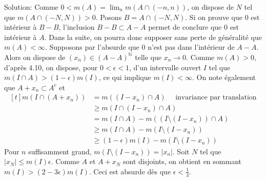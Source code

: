 \documentclass{report}
\begin{document}
Solution: Comme $0<m(A) = \lim_n m(A \cap (-n,n))$, on dispose de $N$ tel que $m(A\cap (-N,N))>0$. Posons $B=A \cap (-N,N)$. Si on prouve que $0$ est intérieur à $B-B$, l'inclusion $B-B\subset A-A$ permet de conclure que $0$ est intérieur à $A$. Dans la suite, on pourra donc supposer sans perte de généralité que $m(A)<\infty$. \newline \newline 
Supposons par l'absurde que $0$ n'est pas dans l'intérieur de $A-A$. Alors on dispose de $(x_n) \in (A-A)^{\mathbb N}$ telle que $x_n\to 0$.\newline
Comme $m(A)>0$, d'après 4.10, on dispose, pour $0<\epsilon<1$, d'un intervalle ouvert $I$ tel que $m(I\cap A) > (1-\epsilon)m(I)$, ce qui implique $m(I)<\infty$. \newline
On note également que $A+x_n\subset A^c$ et $$\begin{aligned}[t] m(I \cap (A + x_n )) &= m((I-x_n)\cap A) \quad \text{ invariance par translation} \\
&\geq m(I\cap (I-x_n)\cap A) \\
&= m(I\cap A) -  m((I\setminus (I-x_n)) \cap A) \\ 
&\geq m(I\cap A) - m(I\setminus (I-x_n))\\
&\geq (1-\epsilon)m(I) - m(I\setminus (I-x_n))
\end{aligned}$$ 
Pour $n$ suffisamment grand, $m(I\setminus (I-x_n)) =  |x_n|$. Soit $N$ tel que $|x_N|\leq  m(I)\epsilon$.\newline
Comme $A$ et $A+x_N$ sont disjoints, on obtient en sommant $m(I)> (2-3\epsilon)m(I)$.\newline
Ceci est absurde dès que $\epsilon <\frac 13$.

\newpage
\subsection{} \\\\
\end{document}
